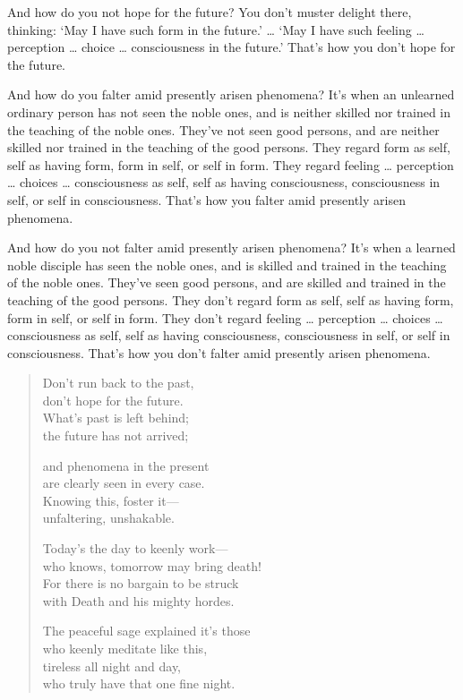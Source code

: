 \documentclass[12pt,openany]{book}%
\begin{document}
And how do you not hope for the future? You don’t muster delight there, thinking: ‘May I have such form in the future.’ … ‘May I have such feeling … perception … choice … consciousness in the future.’ That’s how you don’t hope for the future. 

And how do you falter amid presently arisen phenomena? It’s when an unlearned ordinary person has not seen the noble ones, and is neither skilled nor trained in the teaching of the noble ones. They’ve not seen good persons, and are neither skilled nor trained in the teaching of the good persons. They regard form as self, self as having form, form in self, or self in form. They regard feeling … perception … choices … consciousness as self, self as having consciousness, consciousness in self, or self in consciousness. That’s how you falter amid presently arisen phenomena. 

And how do you not falter amid presently arisen phenomena? It’s when a learned noble disciple has seen the noble ones, and is skilled and trained in the teaching of the noble ones. They’ve seen good persons, and are skilled and trained in the teaching of the good persons. They don’t regard form as self, self as having form, form in self, or self in form. They don’t regard feeling … perception … choices … consciousness as self, self as having consciousness, consciousness in self, or self in consciousness. That’s how you don’t falter amid presently arisen phenomena. 

\begin{verse}%
Don’t run back to the past, \\
don’t hope for the future. \\
What’s past is left behind; \\
the future has not arrived; 

and phenomena in the present \\
are clearly seen in every case. \\
Knowing this, foster it—\\
unfaltering, unshakable. 

Today’s the day to keenly work—\\
who knows, tomorrow may bring death! \\
For there is no bargain to be struck \\
with Death and his mighty hordes. 

The peaceful sage explained it’s those \\
who keenly meditate like this, \\
tireless all night and day, \\
who truly have that one fine night. 

%
\end{verse}
\end{document}
